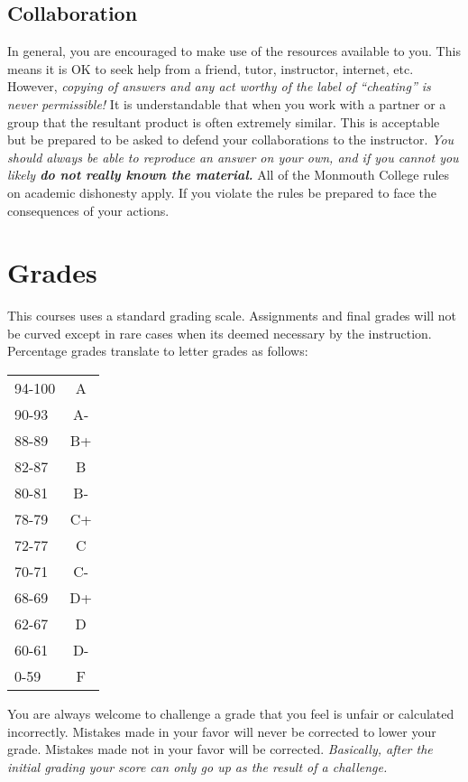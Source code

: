 \documentclass[10pt]{article}
\begin{document}
\subsection{Collaboration}

In general, you are encouraged to make use of the resources available to you.  This means it is OK to seek help from a friend, tutor, instructor, internet, etc.  However, \textit{copying of answers and any act worthy of the label of ``cheating'' is never permissible!}  It is understandable that when you work with a partner or a group that the resultant product is often extremely similar.  This is acceptable but be prepared to be asked to defend your collaborations to the instructor.  \textit{You should always be able to reproduce an answer on your own, and if you cannot you likely \textbf{do not really known the material.}} All of the Monmouth College rules on academic dishonesty apply.  If you violate the rules be prepared to face the consequences of your actions.  

\section{Grades}

This courses uses a standard grading scale.  Assignments and final grades will not be curved except in rare cases when its deemed necessary by the instruction.  Percentage grades translate to letter grades as follows:
\newline
\begin{small}
\begin{tabular}{lc}
94-100 & A \\
90-93 & A- \\
88-89 & B+ \\
82-87 & B \\
80-81 & B- \\
78-79 & C+ \\
72-77 & C \\
70-71 & C- \\
68-69 & D+ \\
62-67 & D \\
60-61 & D- \\
0-59 & F 
\end{tabular}
\end{small}
\newline
You are always welcome to challenge a grade that you feel is unfair or calculated incorrectly.  Mistakes made in your favor will never be corrected to lower your grade.  Mistakes made not in your favor will be corrected.  \textit{Basically, after the initial grading your score can only go up as the result of a challenge.}
\end{document}
